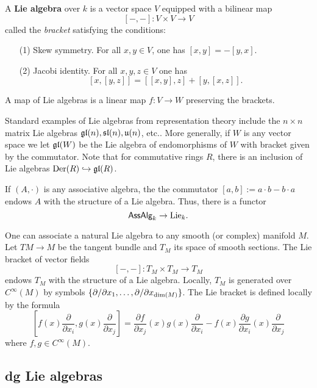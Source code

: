 \documentclass[11pt]{amsart}
\begin{document}
\begin{dfn}
A {\bf Lie algebra} over $k$ is a vector space $V$ equipped with a bilinear map
\[
[-,-] : V \times V \to V
\]
called the {\em bracket} satisfying the conditions:
\begin{enumerate}
\item[(1)] Skew symmetry.
For all $x,y \in V$, one has $[x,y] = - [y,x]$. 
\item[(2)] Jacobi identity. 
For all $x,y,z \in V$ one has 
\[
[x,[y,z]] = [[x,y],z] + [y,[x,z]] .
\]
\end{enumerate}
A map of Lie algebras is a linear map $f : V \to W$ preserving the brackets. 
\end{dfn}

\begin{rmk}
Standard examples of Lie algebras from representation theory include the $n \times n$ matrix Lie algebras ${\mathfrak{gl}}(n), \mathfrak s \mathfrak l(n), \mathfrak u(n)$, etc.. 
More generally, if $W$ is any vector space we let ${\mathfrak{gl}}(W)$ be the Lie algebra of endomorphisms of $W$ with bracket given by the commutator. 
Note that for commutative rings $R$, there is an inclusion of Lie algebras ${\rm Der} (R) \hookrightarrow {\mathfrak{gl}}(R)$. 
\end{rmk}
 

\begin{rmk}
If $(A,\cdot)$ is any associative algebra, the the commutator $[a,b] := a \cdot b  - b \cdot a$ endows $A$ with the structure of a Lie algebra. 
Thus, there is a functor
\[
{\sf AssAlg}_k \to {\rm Lie}_k .
\]
\end{rmk}



\begin{eg}
One can associate a natural Lie algebra to any smooth (or complex) manifold $M$. 
Let $TM \to M$ be the tangent bundle and $T_M$ its space of smooth sections. 
The Lie bracket of vector fields 
\[
[-,-] : T_M \times T_M \to T_M
\]
endows $T_M$ with the structure of a Lie algebra.
Locally, $T_M$ is generated over $C^\infty(M)$ by symbols $\{\partial/ \partial x_1,\ldots,\partial / \partial x_{{\rm dim}(M)}\}$. 
The Lie bracket is defined locally by the formula
\[
\left[ f(x) \frac{\partial}{\partial x_i} , g(x) \frac{\partial}{\partial x_j} \right] = \frac{\partial f}{\partial x_j} (x) g(x) \frac{\partial}{\partial x_i} - f(x) \frac{\partial g}{\partial x_i} (x) \frac{\partial}{\partial x_j} 
\]
where $f,g \in C^\infty(M)$.
\end{eg}

\subsection{dg Lie algebras}
\end{document}
